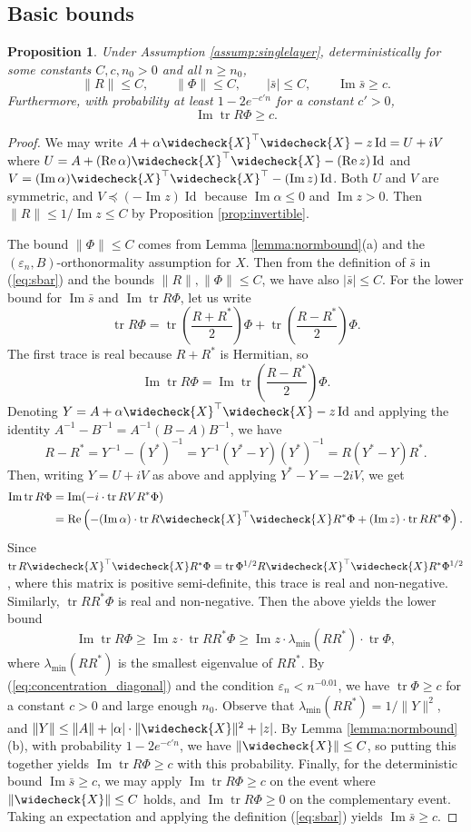 \documentclass{article}
\newtheorem{proposition}[theorem]{Proposition}
\theoremstyle{definition}
\newcommand{\Id}{\operatorname{Id}}
\newcommand{\tr}{\operatorname{tr}}
\newcommand{\eps}{\varepsilon}
\newcommand{\vX}{\widecheck{X}}
\newcommand{\1}{\mathbf{1}}
\renewcommand{\Im}{\operatorname{Im}}
\renewcommand{\Re}{\operatorname{Re}}
\begin{document}
\subsection{Basic bounds}
\begin{proposition}\label{prop:basic}
Under Assumption \ref{assump:singlelayer}, deterministically
for some constants $C,c,n_0>0$ and all $n \geq n_0$,
\[\|R\| \leq C, \qquad \|\Phi\| \leq C, \qquad
|\bar{s}| \leq C, \qquad \Im \bar{s} \geq c.\]
Furthermore, with probability at least $1-2e^{-c'n}$ for a constant $c'>0$, 
\[\Im \tr R\Phi \geq c.\]
\end{proposition}
\begin{proof}
We may write $A+\alpha \vX^\top \vX-z\Id=U+iV$ where $U=A+(\Re \alpha)\vX^\top
\vX-(\Re z)\Id$ and $V=(\Im \alpha) \vX^\top \vX^\top-(\Im z)\Id$. Both $U$ and
$V$ are
symmetric, and $V \preceq (-\Im z)\Id$ because $\Im \alpha \leq 0$ and $\Im
z>0$. Then $\|R\| \leq 1/\Im z \leq C$ by Proposition \ref{prop:invertible}.

The bound $\|\Phi\| \leq C$ comes from Lemma \ref{lemma:normbound}(a) and the
$(\eps_n,B)$-orthonormality assumption for $X$.
Then from the definition of $\bar{s}$ in
(\ref{eq:sbar}) and the bounds $\|R\|,\|\Phi\| \leq C$, we have also
$|\bar{s}| \leq C$. For the lower bound for $\Im \bar{s}$ and $\Im \tr R\Phi$,
let us write
\[\tr R\Phi=\tr \left(\frac{R+R^*}{2}\right)\Phi+\tr \left(\frac{R-R^*}{2}\right)\Phi.\]
The first trace is real because $R+R^*$ is Hermitian, so
\[\Im \tr R\Phi=\Im \tr \left(\frac{R-R^*}{2}\right)\Phi.\]
Denoting $Y=A+\alpha \vX^\top \vX-z\Id$ and applying the identity
$A^{-1}-B^{-1}=A^{-1}(B-A)B^{-1}$, we have
\[R-R^*=Y^{-1}-(Y^*)^{-1}
=Y^{-1}(Y^*-Y)(Y^*)^{-1}=R(Y^*-Y)R^*.\]
Then, writing $Y=U+iV$ as above and applying $Y^*-Y=-2iV$, we get
\begin{align*}
\Im \tr R\Phi&=\Im(-i \cdot \tr RVR^*\Phi)\\
&=\Re\left(-(\Im \alpha) \cdot \tr R \vX^\top \vX R^*\Phi
+(\Im z) \cdot \tr RR^*\Phi\right).
\end{align*}
Since $\tr R\vX^\top \vX R^*\Phi=\tr \Phi^{1/2}R\vX^\top \vX R^*\Phi^{1/2}$,
where this matrix is positive semi-definite, this trace is real and
non-negative. Similarly, $\tr RR^*\Phi$ is real and non-negative. Then the above
yields the lower bound
\[\Im \tr R\Phi \geq \Im z \cdot \tr RR^*\Phi
\geq \Im z \cdot \lambda_{\min}(RR^*) \cdot \tr \Phi,\]
where $\lambda_{\min}(RR^*)$ is the smallest eigenvalue of $RR^*$.
By (\ref{eq:concentration_diagonal}) and the condition $\eps_n<n^{-0.01}$, we
have $\tr \Phi \geq c$ for a constant $c>0$ and large enough $n_0$.
Observe that $\lambda_{\min}(RR^*)=1/\|Y\|^2$, and
$\|Y\| \leq \|A\|+|\alpha| \cdot \|\vX\|^2+|z|$.
By Lemma \ref{lemma:normbound}(b), with probability $1-2e^{-c'n}$, we
have $\|\vX\| \leq C$, so putting this together yields $\Im \tr R\Phi \geq c$
with this probability. Finally, for the deterministic
bound $\Im \bar{s} \geq c$, we may apply $\Im \tr R\Phi \geq c$ on the event
where $\|\vX\| \leq C$ holds, and $\Im \tr R\Phi \geq 0$
on the complementary event. Taking an expectation and applying
the definition (\ref{eq:sbar}) yields $\Im \bar{s} \geq c$.
\end{proof}
\end{document}
